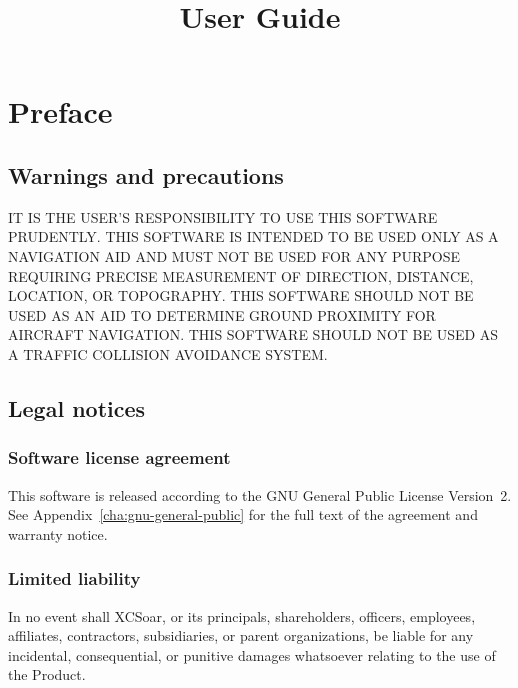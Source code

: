 \documentclass[english,a4paper,11pt]{refrep}
\title{User Guide}%
\begin{document}
\sloppy

\maketitle

 
\begingroup
\setlength{\parskip}{0.1\baselineskip}
\tableofcontents
\endgroup


\chapter*{Preface}

\section*{Warnings and precautions}

\warning IT IS THE USER'S RESPONSIBILITY TO USE THIS SOFT\-WARE PRUDENTLY. THIS SOFTWARE IS 
INTENDED TO BE USED ONLY AS A NAVIGATION AID AND MUST NOT BE USED FOR ANY PURPOSE REQUIRING 
PRECISE MEASURE\-MENT OF DIRECTION, DISTANCE, LOCATION, OR TOPO\-GRAPHY. THIS SOFTWARE SHOULD 
NOT BE USED AS AN AID TO DETERMINE GROUND PROXIMITY FOR AIRCRAFT NAVIGATION. THIS SOFTWARE 
SHOULD NOT BE USED AS A TRAFFIC COLLISION AVOIDANCE SYSTEM.



\section*{Legal notices}

\subsection*{Software license agreement}

This software is released according to the GNU General Public License
Version~2.  See Appendix~\ref{cha:gnu-general-public} for the full
text of the agreement and warranty notice.

\subsection*{Limited liability}

In no event shall XCSoar, or its principals, shareholders, officers,
employees, affiliates, contractors, subsidiaries, or parent
organizations, be liable for any incidental, consequential, or
punitive damages whatsoever relating to the use of the Product.
\end{document}
